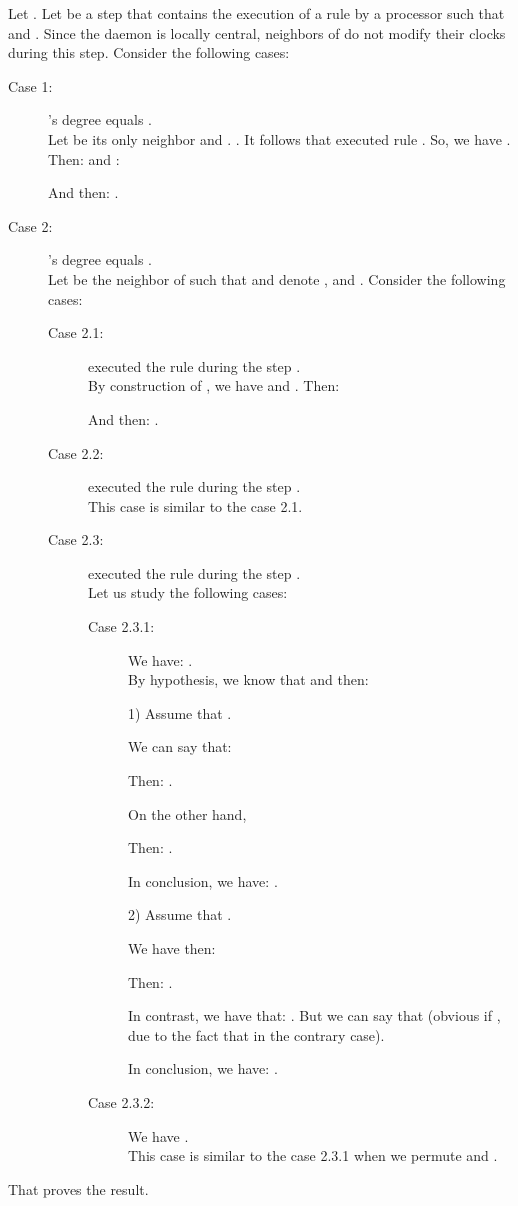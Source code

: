 \documentclass[11pt,english,letterpaper]{article}
\newenvironment{proof}{{\noindent\bf Proof. } }{{\hfill }}
\begin{document}
\begin{proof}
Let . Let  be a step that contains the execution of a rule by a processor  such that  and . Since the daemon is locally central, neighbors of  do not modify their clocks during this step. Consider the following cases:

\begin{description}
\item[Case 1:] 's degree equals .\\
Let  be its only neighbor and . . It follows that  executed rule . So, we have . Then:  and :

And then: .

\item[Case 2:] 's degree equals .\\
Let  be the neighbor of  such that  and denote ,  and . Consider the following cases:

\begin{description}
\item[Case 2.1:]  executed the rule  during the step .\\
By construction of , we have  and . Then:

And then: .

\item[Case 2.2:]  executed the rule  during the step .\\
This case is similar to the case 2.1.

\item[Case 2.3:]  executed the rule  during the step .\\
Let us study the following cases:

\begin{description}
\item[Case 2.3.1:] We have: .\\
By hypothesis, we know that  and then: 


1) Assume that .

We can say that: 

Then: . 

On the other hand,

Then: . 

In conclusion, we have: .

2) Assume that .

We have then: 

Then: . 

In contrast, we have that: . But we can say that  (obvious if 
, due to the fact that
 in the contrary case).

In conclusion, we have: .
\item[Case 2.3.2:] We have .\\
This case is similar to the case 2.3.1 when we permute  and .

\end{description}
\end{description}
\end{description}

That proves the result.
\end{proof}
			
\end{document}
